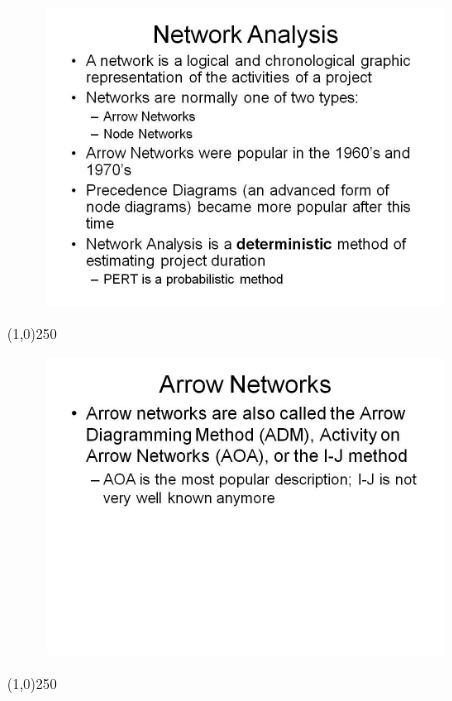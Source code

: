




\begin{frame}
\begin{figure}
	\centering
		\includegraphics[width = 10.5cm]{oldnotes/Slide44.jpg}
\end{figure}
\end{frame}
\begin{center}\line(1,0){250}\end{center}





\begin{frame}
\begin{figure}
	\centering
		\includegraphics[width = 10.5cm]{oldnotes/Slide45.jpg}
\end{figure}
\end{frame}
\begin{center}\line(1,0){250}\end{center}





